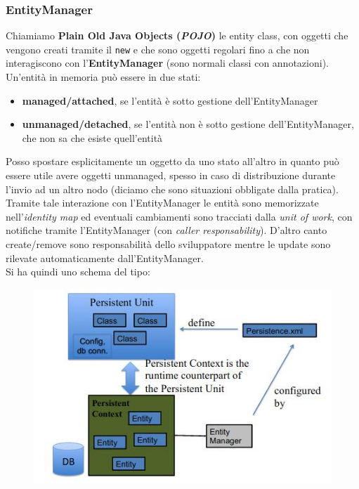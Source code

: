 \documentclass[a4paper,12pt, oneside]{book}
\begin{document}
\subsubsection{EntityManager}
Chiamiamo \textbf{Plain Old Java Objects (\textit{POJO})} le entity class, con
oggetti che vengono creati tramite il \texttt{new} e che sono 
oggetti regolari fino a che non interagiscono con
l'\textbf{EntityManager} (sono normali classi con annotazioni).\\
Un'entità in memoria può essere in due stati:
\begin{itemize}
  \item \textbf{managed/attached}, se l'entità è sotto gestione
  dell'EntityManager 
  \item \textbf{unmanaged/detached}, se l'entità non è sotto gestione
  dell'EntityManager, che non sa che esiste quell'entità
\end{itemize}
Posso spostare esplicitamente un oggetto da uno stato all'altro in quanto può
essere utile avere oggetti unmanaged, spesso in caso di distribuzione durante
l'invio ad un altro nodo (diciamo che sono situazioni obbligate dalla
pratica).\\ 
Tramite tale interazione con l'EntityManager le entità sono memorizzate 
nell'\textit{identity map} ed eventuali cambiamenti sono tracciati dalla
\textit{unit of work}, con notifiche tramite l'EntityManager (con \textit{caller
  responsability}). D'altro canto create/remove sono responsabilità dello
sviluppatore mentre le update sono rilevate automaticamente
dall'EntityManager.\\
Si ha quindi uno schema del tipo:
\begin{figure}[H]
  \centering
  \includegraphics[scale = 0.57]{img/em.jpg}
\end{figure}
\end{document}
